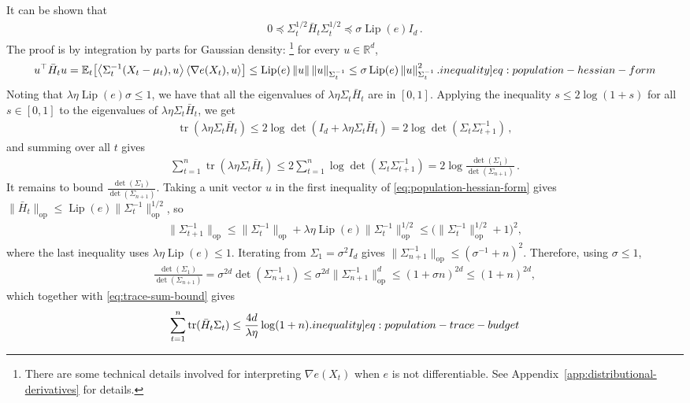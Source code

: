\documentclass[12pt,cleveref]{jmlr}
\newcommand{\ineqlabel}[1]{\label[inequality]{#1}}
\newcommand{\R}{\mathbb R}
\newcommand{\E}{\mathbb E}
\newcommand{\tr}{\operatorname{tr}}
\newcommand{\Lip}{\operatorname{Lip}}
\newcommand{\op}{\mathrm{op}}
\newcommand{\1}{\mathbf 1}
\newcommand{\ip}[2]{\left\langle #1,#2\right\rangle}
\newcommand{\norm}[1]{\left\lVert #1\right\rVert}
\newcommand{\normm}[2]{\left\lVert #1\right\rVert_{#2}}
\begin{document}
It can be shown that
\begin{align}
    0 \preceq \Sigma_t^{1/2} \bar H_t \Sigma_t^{1/2} \preceq \sigma \Lip(e) I_d\,.
\end{align}
The proof is by integration by parts for Gaussian density:
\footnote{
    There are some technical details involved for interpreting $\nabla e(X_t)$ when $e$ is not differentiable.
    See Appendix~\ref{app:distributional-derivatives} for details.
}
for every $u\in\R^d$,
\begin{align}
    u^\top\bar H_tu
    =\E_t\bigl[\ip{\Sigma_t^{-1}(X_t-\mu_t)}{u}\ip{\nabla e(X_t)}{u}\bigr]
    \leq\Lip(e)\norm{u}\normm{u}{\Sigma_t^{-1}}
    \leq\sigma\Lip(e)\normm{u}{\Sigma_t^{-1}}^2.
    \ineqlabel{eq:population-hessian-form}
\end{align}
Noting that $\lambda \eta \Lip(e)\sigma\leq 1$, we have that all the eigenvalues of $\lambda \eta \Sigma_t \bar H_t$
are in $[0,1]$.
Applying the inequality $s \leq 2 \log(1 + s)$ for all $s \in [0,1]$ to the eigenvalues of $\lambda \eta \Sigma_t \bar H_t$, we get
\begin{align}
    \tr(\lambda \eta \Sigma_t \bar H_t)
    \leq 2 \log\det\left(
        I_d + \lambda \eta \Sigma_t \bar{H}_t
    \right)
    = 2 \log\det\left(
        \Sigma_t \Sigma_{t+1}^{-1}
    \right)\,,
\end{align}
and summing over all $t$ gives
\begin{align}
    \sum_{t=1}^n \tr(\lambda \eta \Sigma_t \bar H_t) \leq 2 \sum_{t=1}^n \log\det\left(
        \Sigma_t \Sigma_{t+1}^{-1}
    \right)
    = 2 \log\frac{\det(\Sigma_1)}{\det(\Sigma_{n+1})}
    \,.
    \label{eq:trace-sum-bound}
\end{align}
It remains to bound $\frac{\det(\Sigma_1)}{\det(\Sigma_{n+1})}$.
Taking a unit vector $u$ in the first inequality of \cref{eq:population-hessian-form} gives $\|\bar H_t\|_{\op}\leq\Lip(e)\|\Sigma_t^{-1}\|_{\op}^{1/2}$, so
\begin{align}
    \|\Sigma_{t+1}^{-1}\|_{\op}
    \leq\|\Sigma_t^{-1}\|_{\op}+\lambda\eta\Lip(e)\|\Sigma_t^{-1}\|_{\op}^{1/2}
    \leq\bigl(\|\Sigma_t^{-1}\|_{\op}^{1/2}+1\bigr)^2,
\end{align}
where the last inequality uses $\lambda\eta\Lip(e)\leq1$.
Iterating from $\Sigma_1=\sigma^2I_d$ gives $\|\Sigma_{n+1}^{-1}\|_{\op}\leq(\sigma^{-1}+n)^2$.
Therefore, using $\sigma\leq1$,
\begin{align}
    \frac{\det(\Sigma_1)}{\det(\Sigma_{n+1})}
    =\sigma^{2d}\det(\Sigma_{n+1}^{-1})
    \leq\sigma^{2d}\|\Sigma_{n+1}^{-1}\|_{\op}^d
    \leq(1+\sigma n)^{2d}
    \leq(1+n)^{2d},
\end{align}
which together with \cref{eq:trace-sum-bound} gives
\begin{align}
    \sum_{t=1}^n\tr(\bar H_t\Sigma_t)
    \leq\frac{4d}{\lambda\eta}\log(1+n).
    \ineqlabel{eq:population-trace-budget}
\end{align}
\end{document}
